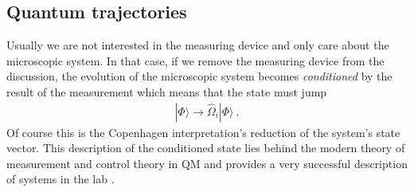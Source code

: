 \documentclass[12pt]{article}
\theoremstyle{plain}
\theoremstyle{definition}
\theoremstyle{remark}
\def\ket#1{| #1\rangle}
\newcommand{\EQ}[1]{\begin{equation}\begin{split} #1
\end{split}\end{equation}}
\begin{document}
\subsection{Quantum trajectories}\label{s2.2}

Usually we are not interested in the measuring device and only care about the microscopic system. In that case, if we remove the measuring device from the discussion, the evolution of the microscopic system becomes {\it conditioned\/} by the result of the measurement which means that the state must jump
\EQ{
\ket{\Phi}\longrightarrow\hat\Omega_i\ket{\Phi}\ .
\label{col}
} 
Of course this is the Copenhagen interpretation's reduction of the system's state vector.
This description of the conditioned state lies behind the modern theory of measurement and control theory in QM and provides a very successful description of systems in the lab \cite{WMbook,PK}. 
\end{document}
